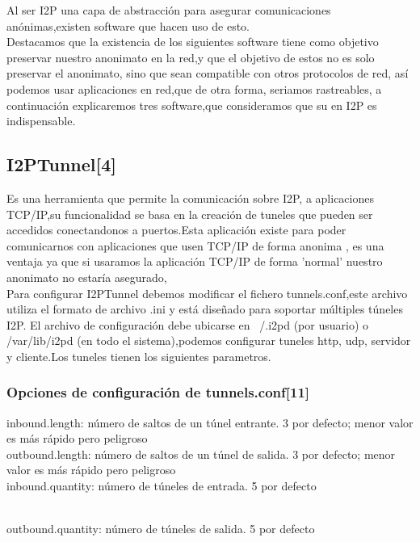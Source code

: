 \documentclass{article}
\begin{document}
Al ser  I2P una capa de abstracción para asegurar comunicaciones anónimas,existen software que hacen uso de esto.
\\

Destacamos que la existencia de los siguientes software tiene como objetivo preservar nuestro anonimato en la red,y que el objetivo de estos no es solo preservar
el anonimato, sino que sean compatible con otros protocolos de red, así podemos usar aplicaciones en red,que de otra forma, seriamos rastreables,
a continuación explicaremos tres software,que consideramos que su en I2P  es indispensable.
\subsection{I2PTunnel[4]}

Es una herramienta que permite la comunicación sobre I2P, a aplicaciones TCP/IP,su funcionalidad se basa en la creación de tuneles que pueden ser accedidos
conectandonos a puertos.Esta aplicación existe para poder comunicarnos con aplicaciones que usen TCP/IP de forma anonima , es una ventaja ya que si usaramos la aplicación TCP/IP de forma 'normal'
nuestro anonimato no estaría asegurado,
\\

Para configurar I2PTunnel debemos modificar el fichero tunnels.conf,este archivo utiliza el formato de archivo .ini y está diseñado para soportar múltiples túneles I2P. El archivo 
de configuración debe ubicarse en  ~/.i2pd (por usuario) o /var/lib/i2pd (en todo el sistema),podemos configurar tuneles http, udp, servidor y cliente.Los tuneles tienen los 
siguientes parametros.
\\


\subsubsection{Opciones de configuración de tunnels.conf[11]}
inbound.length: número de saltos de un túnel entrante. 3 por defecto; menor valor es más rápido pero peligroso
\\

outbound.length: número de saltos de un túnel de salida. 3 por defecto; menor valor es más rápido pero peligroso
\\

inbound.quantity: número de túneles de entrada. 5 por defecto

\\
outbound.quantity: número de túneles de salida. 5 por defecto
\\
\end{document}
